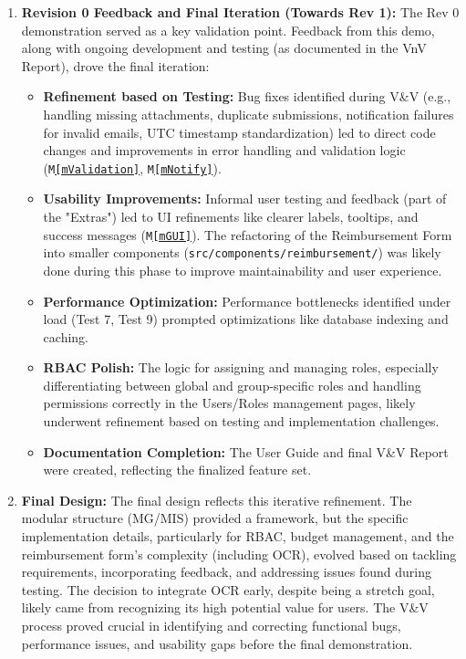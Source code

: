 \documentclass{article}
\begin{document}
\begin{enumerate}
    \item \textbf{Revision 0 Feedback and Final Iteration (Towards Rev 1):} The Rev 0 demonstration served as a key validation point. Feedback from this demo, along with ongoing development and testing (as documented in the VnV Report), drove the final iteration:
        \begin{itemize}
            \item \textbf{Refinement based on Testing:} Bug fixes identified during V\&V (e.g., handling missing attachments, duplicate submissions, notification failures for invalid emails, UTC timestamp standardization) led to direct code changes and improvements in error handling and validation logic (\texttt{M\ref{mValidation}}, \texttt{M\ref{mNotify}}).
            \item \textbf{Usability Improvements:} Informal user testing and feedback (part of the "Extras") led to UI refinements like clearer labels, tooltips, and success messages (\texttt{M\ref{mGUI}}). The refactoring of the Reimbursement Form into smaller components (\texttt{src/components/reimbursement/}) was likely done during this phase to improve maintainability and user experience.
            \item \textbf{Performance Optimization:} Performance bottlenecks identified under load (Test 7, Test 9) prompted optimizations like database indexing and caching.
            \item \textbf{RBAC Polish:} The logic for assigning and managing roles, especially differentiating between global and group-specific roles and handling permissions correctly in the Users/Roles management pages, likely underwent refinement based on testing and implementation challenges.
            \item \textbf{Documentation Completion:} The User Guide and final V\&V Report were created, reflecting the finalized feature set.
        \end{itemize}

    \item \textbf{Final Design:} The final design reflects this iterative refinement. The modular structure (MG/MIS) provided a framework, but the specific implementation details, particularly for RBAC, budget management, and the reimbursement form's complexity (including OCR), evolved based on tackling requirements, incorporating feedback, and addressing issues found during testing. The decision to integrate OCR early, despite being a stretch goal, likely came from recognizing its high potential value for users. The V\&V process proved crucial in identifying and correcting functional bugs, performance issues, and usability gaps before the final demonstration.
\end{enumerate}
\end{document}
